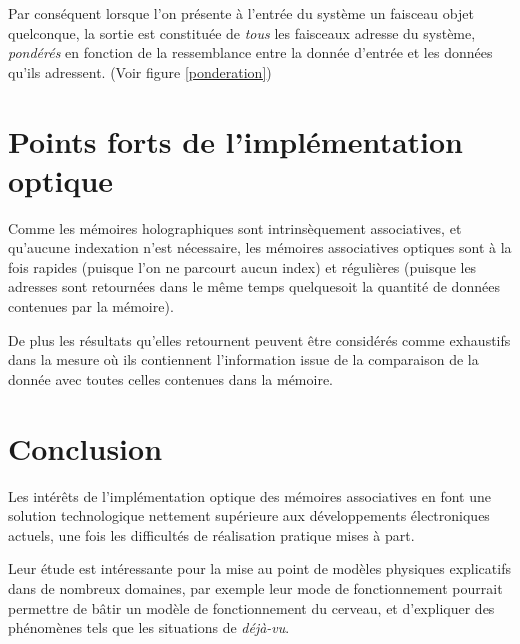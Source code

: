 \documentclass[10pt,a4paper]{article}
\begin{document}
		Par conséquent lorsque l'on présente à l'entrée du système un faisceau objet quelconque, la sortie est constituée de \emph{tous} les faisceaux adresse du système, \emph{pondérés} en fonction de la ressemblance entre la donnée d'entrée et les données qu'ils adressent. (Voir figure \ref{ponderation})  
	\section[Points forts de l'implémentation optique]{Points forts de l'implémentation optique}
	Comme les mémoires holographiques sont intrinsèquement associatives, et qu'aucune indexation n'est nécessaire, les mémoires associatives optiques sont à la fois rapides (puisque l'on ne parcourt aucun index) et régulières (puisque les adresses sont retournées dans le même temps quelquesoit la quantité de données contenues par la mémoire).
	
	De plus les résultats qu'elles retournent peuvent être considérés comme exhaustifs dans la mesure où ils contiennent l'information issue de la comparaison de la donnée avec toutes celles contenues dans la mémoire.
	\section[Conclusion]{Conclusion}
	Les intérêts de l'implémentation optique des mémoires associatives en font une solution technologique nettement supérieure aux développements électroniques actuels, une fois les difficultés de réalisation pratique mises à part.
	
	Leur étude est intéressante pour la mise au point de modèles physiques explicatifs dans de nombreux domaines, par exemple leur mode de fonctionnement pourrait permettre de bâtir un modèle de fonctionnement du cerveau, et d'expliquer des phénomènes tels que les situations de \emph{déjà-vu}.	
\end{document}
